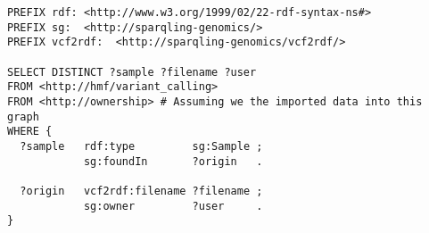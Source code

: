 \begin{lstlisting}[language=SPARQL]
PREFIX rdf: <http://www.w3.org/1999/02/22-rdf-syntax-ns#>
PREFIX sg:  <http://sparqling-genomics/>
PREFIX vcf2rdf:  <http://sparqling-genomics/vcf2rdf/>

SELECT DISTINCT ?sample ?filename ?user
FROM <http://hmf/variant_calling>
FROM <http://ownership> # Assuming we the imported data into this graph
WHERE {
  ?sample   rdf:type         sg:Sample ;
            sg:foundIn       ?origin   .

  ?origin   vcf2rdf:filename ?filename ;
            sg:owner         ?user     .
}
\end{lstlisting}
